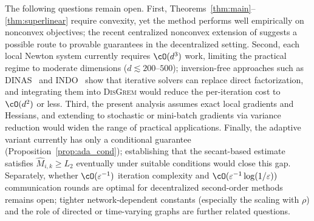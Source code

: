 \documentclass[review,onefignum,onetabnum]{siamart171218}
\begin{document}
	The following questions remain open.
	First, Theorems~\ref{thm:main}--\ref{thm:superlinear} require convexity,
	yet the method performs well empirically on nonconvex objectives;
	the recent centralized nonconvex extension of
	\citet{ding2025nonconvex} suggests a possible route to provable
	guarantees in the decentralized setting.
	Second, each local Newton system currently requires $\cO(d^3)$ work,
	limiting the practical regime to moderate dimensions
	($d\lesssim 200$--$500$);
	inversion-free approaches such as DINAS~\citep{crane2025dinas}
	and INDO~\citep{yuan2023indo} show that iterative
	solvers can replace direct factorization, and
	integrating them into \textsc{DisGrem} would reduce the
	per-iteration cost to $\cO(d^2)$ or less.
	Third, the present analysis assumes exact local gradients and Hessians,
	and extending to stochastic or mini-batch gradients via
	variance reduction would widen the range of practical
	applications.
	Finally, the adaptive variant currently has only a conditional guarantee
	(Proposition~\ref{prop:ada_cond});
	establishing that the secant-based estimate satisfies
	$\hat M_{i,k}\ge L_2$ eventually under suitable conditions
	would close this gap.
	Separately, whether $\cO(\varepsilon^{-1})$ iteration complexity
	and $\cO(\varepsilon^{-1}\log(1/\varepsilon))$ communication
	rounds are optimal for decentralized second-order methods remains
	open; tighter network-dependent constants (especially the
	scaling with $\rho$) and the role of directed or time-varying
	graphs are further related questions.
	
\end{document}
